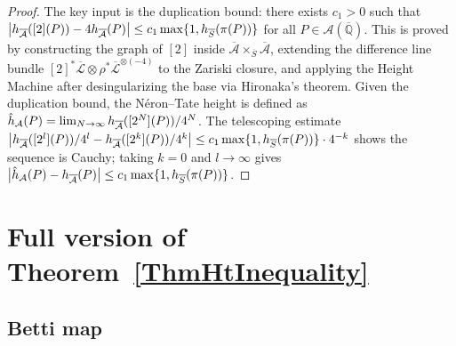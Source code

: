 \begin{proof}
  The key input is the duplication bound: there exists \(c_1 > 0\) such that
  \(\bigl|h_{\overline{\mathcal{A}}}([2](P)) - 4h_{\overline{\mathcal{A}}}(P)\bigr| \le c_1 \max\{1, h_{\overline{S}}(\pi(P))\}\)
  for all \(P \in \mathcal{A}(\overline{\mathbb{Q}})\).
  This is proved by constructing the graph of \([2]\) inside
  \(\overline{\mathcal{A}} \times_{\overline{S}} \overline{\mathcal{A}}\),
  extending the difference line bundle \([2]^*\overline{\mathcal{L}} \otimes \rho^*\overline{\mathcal{L}}^{\otimes(-4)}\)
  to the Zariski closure, and applying the Height Machine after desingularizing
  the base via Hironaka's theorem.
  Given the duplication bound, the Néron--Tate height is defined as
  \(\hat{h}_{\mathcal{A}}(P) = \lim_{N \to \infty} h_{\overline{\mathcal{A}}}([2^N](P))/4^N\).
  The telescoping estimate
  \(\bigl|h_{\overline{\mathcal{A}}}([2^l](P))/4^l - h_{\overline{\mathcal{A}}}([2^k](P))/4^k\bigr| \le c_1 \max\{1,h_{\overline{S}}(\pi(P))\} \cdot 4^{-k}\)
  shows the sequence is Cauchy; taking \(k = 0\) and \(l \to \infty\) gives
  \(\bigl|\hat{h}_{\mathcal{A}}(P) - h_{\overline{\mathcal{A}}}(P)\bigr| \le c_1 \max\{1, h_{\overline{S}}(\pi(P))\}\).
\end{proof}

\section{Full version of Theorem~\ref{ThmHtInequality}}

\subsection{Betti map}

